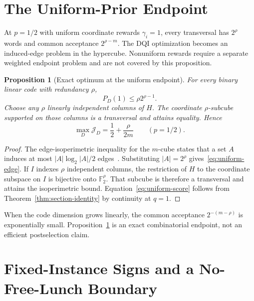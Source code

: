 \documentclass[journal]{IEEEtran}
\newtheorem{proposition}[theorem]{Proposition}
\theoremstyle{definition}
\theoremstyle{remark}
\newcommand{\F}{\mathbb F}
\begin{document}
\appendices

\section{The Uniform-Prior Endpoint}
\label{app:uniform}

At $p=1/2$ with uniform coordinate rewards $\gamma_i=1$, every transversal
has $2^\rho$ words and common acceptance $2^{\rho-m}$.  The DQI optimization
becomes an induced-edge problem in the hypercube.  Nonuniform rewards require
a separate weighted endpoint problem and are not covered by this proposition.

\begin{proposition}[Exact optimum at the uniform endpoint]
\label{prop:uniform}
For every binary linear code with redundancy $\rho$,
\begin{equation}
 P_D(1)\le\rho2^{\rho-1}.
 \label{eq:uniform-edge}
\end{equation}
Choose any $\rho$ linearly independent columns of $H$.  The coordinate
$\rho$-subcube supported on those columns is a transversal and attains
equality.  Hence
\begin{equation}
 \max_D\mathcal J_D=\frac12+\frac{\rho}{2m}\qquad(p=1/2).
 \label{eq:uniform-score}
\end{equation}
\end{proposition}

\begin{proof}
The edge-isoperimetric inequality for the $m$-cube states that a set $A$
induces at most $|A|\log_2|A|/2$ edges~\cite{harper1966}.  Substituting
$|A|=2^\rho$ gives~\eqref{eq:uniform-edge}.  If $I$ indexes $\rho$
independent columns, the restriction of $H$ to the coordinate subspace on $I$
is bijective onto $\F_2^\rho$.  That subcube is therefore a transversal and
attains the isoperimetric bound.  Equation~\eqref{eq:uniform-score} follows
from Theorem~\ref{thm:section-identity} by continuity at $q=1$.
\end{proof}

When the code dimension grows linearly, the common acceptance $2^{-(m-\rho)}$
is exponentially small.  Proposition~\ref{prop:uniform} is an exact
combinatorial endpoint, not an efficient postselection claim.

\section{Fixed-Instance Signs and a No-Free-Lunch Boundary}
\label{app:fixed-v}
\end{document}

